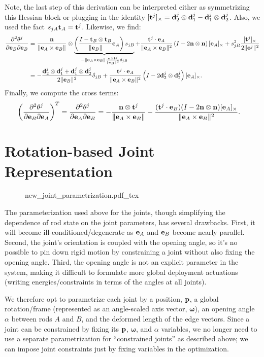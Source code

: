 \documentclass[10pt]{article}
\providecommand{\norm}[1]{\lVert#1\rVert}
\providecommand{\cross}{\times}
\providecommand{\spder}[3]{\frac{\partial^2 #1}{\partial #2 \partial #3}}
\renewcommand{\vec}[1]{{\bf #1}}
\def\normal{{\bf n}}
\def\n{\normal}
\def\d{\vec{d}}
\def\t{\vec{t}}
\def\w{\boldsymbol{\omega}}
\def\p{\vec{p}}
\def\e{\vec{e}}
\begin{document}
Note, the last step of this derivation can be interpreted either as symmetrizing this Hessian block or plugging in the identity
${[\t^j]_\cross = \d^j_2 \otimes \d^j_1 - \d^j_1 \otimes \d^j_2}$. Also, we used the fact $s_{jA} \t_A = \t^j$.
Likewise, we find:
\begin{align*}
    \spder{\theta^j}{\e_B}{\e_B} &=
        \frac{\n}{\norm{\e_A \cross \e_B}} \otimes 
            \underbrace{\left(\frac{I - \t_B \otimes \t_B}{\norm{\e_B}} \e_A \right)s_{jB}}_{-\norm{\e_A \cross \e_B} \frac{\n \cross \t^j}{\norm{\e_B}^2} \delta_{jB}}
        +\frac{\t^j \cdot \e_A}{\norm{\e_A \cross \e_B}^2}\left(I - 2 \n \otimes \n \right) [\e_A]_\cross
        + s_{jB}^2 \frac{[\t^j]_\cross}{2 \norm{\e^j}^2}
    \\
    &=
        -\frac{\d_2^j \otimes \d_1^j + \d_1^j \otimes \d_2^j}{2 \norm{\e_B}^2} \delta_{jB}
        +\frac{\t^j \cdot \e_A}{\norm{\e_A \cross \e_B}^2}\left(I - 2 \d_2^j \otimes \d_2^j \right) [\e_A]_\cross.
\end{align*}
Finally, we compute the cross terms:
\begin{align*}
    \left(\spder{\theta^j}{\e_B}{\e_A}\right)^T =
    \spder{\theta^j}{\e_A}{\e_B} &=
    -\frac{\n \otimes \t^j}{\norm{\e_A \cross \e_B}}
    - \frac{(\t^j \cdot \e_B)(I - 2 \n \otimes \n) [\e_A]_\cross}{\norm{\e_A \cross \e_B}^2}.
\end{align*}

\section{Rotation-based Joint Representation}
\begin{figure}[h]
    \centering
    \def\svgwidth{.5\textwidth}
    {new_joint_parametrization.pdf_tex}
\end{figure}
The parameterization used above for the joints, though simplifying the
dependence of rod state on the joint parameters, has several drawbacks. First,
it will become ill-conditioned/degenerate as $\e_A$ and $\e_B$ become nearly parallel.
Second, the joint's orientation is coupled with the opening angle, so it's no possible
to pin down rigid motion by constraining a joint without also fixing the opening angle.
Third, the opening angle is not an explicit parameter in the system, making it
difficult to formulate more global deployment actuations (writing
energies/constraints in terms of the angles at all joints).

We therefore opt to parametrize each joint by a position, $\p$, a
global rotation/frame (represented as an angle-scaled axis vector, $\w$),
an opening angle $\alpha$ between rods $A$ and $B$, and the deformed length of
the edge vectors. Since a joint can be constrained by fixing its $\p$, $\w$, and
$\alpha$ variables, we no longer need to use a separate parametrization
for ``constrained joints'' as described above; we can impose joint constraints
just by fixing variables in the optimization.
\end{document}
